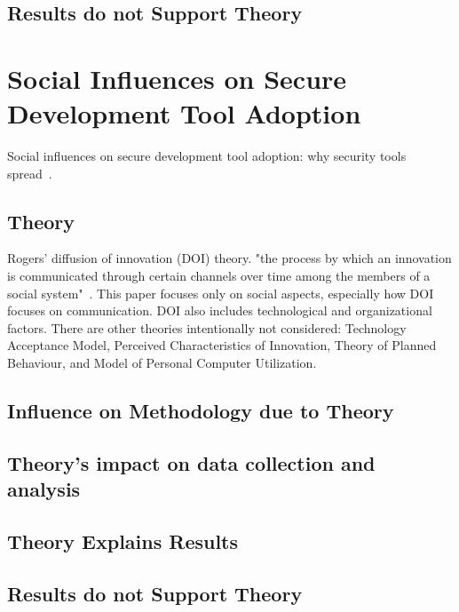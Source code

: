 \documentclass[journal,12pt,onecolumn,]{IEEEtran}
\begin{document}
\subsection{Results do not Support Theory} %


\section{Social Influences on Secure Development Tool Adoption}

Social influences on secure development tool adoption: why security tools spread~\cite{xiao2014social}.


\subsection{Theory}

Rogers' diffusion of innovation (DOI) theory.
"the process by which an innovation is communicated through certain channels over time among the members of a social system"~\cite{rogers1995attributes}.
This paper focuses only on social aspects, especially how DOI focuses on communication.
DOI also includes technological and organizational factors.
There are other theories intentionally not considered: Technology Acceptance Model, Perceived Characteristics of Innovation, Theory of Planned Behaviour, and Model of Personal Computer Utilization.


\subsection{Influence on Methodology due to Theory}

\subsection{Theory's impact on data collection and analysis}

\subsection{Theory Explains Results}

\subsection{Results do not Support Theory} %



\end{document}
